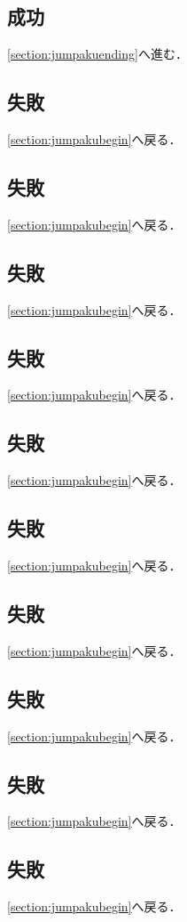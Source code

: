 \subsection{成功}\label{subsection:jumpakulast3successJ}\ref{section:jumpakuending}へ進む．\newpage
\subsection{失敗}\label{subsection:jumpakulast3failureK}\ref{section:jumpakubegin}へ戻る．\newpage
\subsection{失敗}\label{subsection:jumpakulast3failureL}\ref{section:jumpakubegin}へ戻る．\newpage
\subsection{失敗}\label{subsection:jumpakulast3failureM}\ref{section:jumpakubegin}へ戻る．\newpage
\subsection{失敗}\label{subsection:jumpakulast3failureN}\ref{section:jumpakubegin}へ戻る．\newpage
\subsection{失敗}\label{subsection:jumpakulast3failureO}\ref{section:jumpakubegin}へ戻る．\newpage
\subsection{失敗}\label{subsection:jumpakulast3failureP}\ref{section:jumpakubegin}へ戻る．\newpage
\subsection{失敗}\label{subsection:jumpakulast3failureQ}\ref{section:jumpakubegin}へ戻る．\newpage
\subsection{失敗}\label{subsection:jumpakulast3failureR}\ref{section:jumpakubegin}へ戻る．\newpage
\subsection{失敗}\label{subsection:jumpakulast3failureS}\ref{section:jumpakubegin}へ戻る．\newpage
\subsection{失敗}\label{subsection:jumpakulast3failureT}\ref{section:jumpakubegin}へ戻る．\newpage

